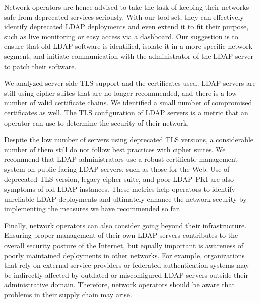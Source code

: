 Network operators are hence advised to take the task of keeping their networks safe from deprecated services seriously. With our tool set, they can effectively identify deprecated \gls{LDAP} deployments and even extend it to fit their purpose, such as live monitoring or easy access via a dashboard. Our suggestion is to ensure that old \gls{LDAP} software is identified, isolate it in a more specific network segment, and initiate communication with the administrator of the \gls{LDAP} server to patch their software.

We analyzed server-side \gls{TLS} support and the certificates used. \gls{LDAP} servers are still using cipher suites that are no longer recommended, and there is a low number of valid certificate chains. We identified a small number of compromised certificates as well. The \gls{TLS} configuration of \gls{LDAP} servers is a metric that an operator can use to determine the security of their network.

Despite the low number of servers using deprecated \gls{TLS} versions, a considerable number of them still do not follow best practices with cipher suites. We recommend that \gls{LDAP} administrators use a robust certificate management system on public-facing \gls{LDAP} servers, such as those for the Web. Use of deprecated \gls{TLS} version, legacy cipher suite, and poor \gls{LDAP} \gls{PKI} are also symptoms of old \gls{LDAP} instances. These metrics help operators to identify unreliable \gls{LDAP} deployments and ultimately enhance the network security by implementing the measures we have recommended so far.

Finally, network operators can also consider going beyond their infrastructure. Ensuring proper management of their own \gls{LDAP} servers contributes to the overall security posture of the Internet, but equally important is awareness of poorly maintained deployments in other networks. For example, organizations that rely on external service providers or federated authentication systems may be indirectly affected by outdated or misconfigured \gls{LDAP} servers outside their administrative domain. Therefore, network operators should be aware that problems in their supply chain may arise.
